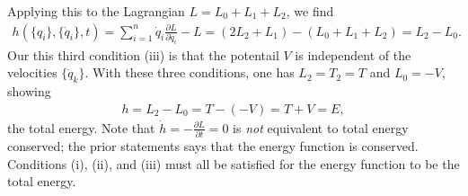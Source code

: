 Applying this to the Lagrangian $L = L_{0} + L_{1} + L_{2}$, we find
\begin{align}
    h(\{q_{i}\},\{\dot{q}_{i}\},t) = \sum_{i=1}^{n} \dot{q}_{i} \frac{\partial L}{\partial \dot{q}_{i}} - L = (2L_{2}+L_{1})-(L_{0}+L_{1}+L_{2}) = L_{2} - L_{0}.
\end{align}
Our this third condition (iii) is that the potentail $V$ is independent of the velocities $\{\dot{q}_{k}\}$. With these three conditions, one has $L_{2} = T_{2} = T$ and $L_{0} = -V$, showing
\begin{align}
    h = L_{2} - L_{0} = T-(-V) = T+V = E,
\end{align}
the total energy. Note that $\dot{h} = -\frac{\partial L}{\partial t} = 0$ is \textit{not} equivalent to total energy conserved; the prior statements says that the energy function is conserved. Conditions (i), (ii), and (iii) must all be satisfied for the energy function to be the total energy.